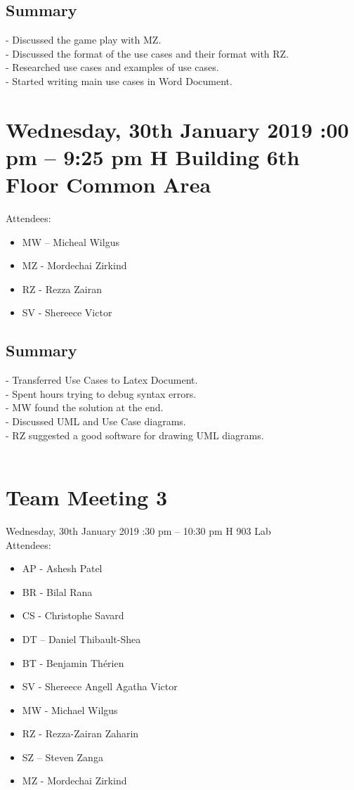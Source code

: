 \documentclass[12pt]{article}
\begin{document}
\subsection{Summary}
-	Discussed the game play with MZ. \\
-	Discussed the format of the use cases and their format with RZ. \\
-	Researched use cases and examples of use cases. \\
-	Started writing main use cases in Word Document. \\

\pagebreak 
\section{Wednesday, 30th January 2019 :00 pm – 9:25 pm \textbar H Building 6th Floor Common Area  }

Attendees: 
\begin{itemize}
	\item MW – Micheal Wilgus
	\item MZ - Mordechai Zirkind  
	\item RZ - Rezza Zairan 
	\item SV - Shereece Victor
\end{itemize}
 

\subsection{Summary}
-	Transferred Use Cases to Latex Document.\\
-	Spent hours trying to debug syntax errors.\\
-	MW found the solution at the end.\\
-	Discussed UML and Use Case diagrams.\\
-	RZ suggested a good software for drawing UML diagrams.\\ \\



\section{Team Meeting 3 }

Wednesday, 30th January 2019 :30 pm – 10:30 pm \textbar H 903 Lab\\
Attendees: 

\begin{itemize}
	\item AP - Ashesh Patel
	\item BR - Bilal Rana
	\item CS - Christophe Savard
	\item DT – Daniel Thibault-Shea
	\item BT - Benjamin Th\'erien
	\item SV - Shereece Angell Agatha Victor
	\item MW - Michael Wilgus
	\item RZ - Rezza-Zairan Zaharin
	\item SZ – Steven Zanga
	\item MZ - Mordechai Zirkind
\end{itemize}
\end{document}
